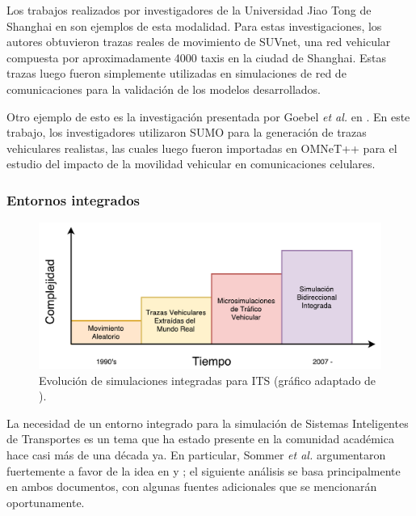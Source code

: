 Los trabajos realizados por investigadores de la Universidad Jiao Tong de Shanghai en \autocite{suvnet1,suvnet2} son ejemplos de esta modalidad. Para estas investigaciones, los autores obtuvieron trazas reales de movimiento de SUVnet, una red vehicular compuesta por aproximadamente 4000 taxis en la ciudad de Shanghai. Estas trazas luego fueron simplemente utilizadas en simulaciones de red de comunicaciones para la validación de los modelos desarrollados.

Otro ejemplo de esto es la investigación presentada por Goebel \emph{et al.} en \autocite{omnetv2xtraces}. En este trabajo, los investigadores utilizaron SUMO para la generación de trazas vehiculares realistas, las cuales luego fueron importadas en OMNeT++ para el estudio del impacto de la movilidad vehicular en comunicaciones celulares. 

\subsubsection{Entornos integrados}\label{sec:integrated_sim}

\begin{figure}
    \centering
    \includegraphics[width=\linewidth]{figuras/sommer_adapted.pdf}
    \caption[Evolución de simulaciones integradas.]{Evolución de simulaciones integradas para ITS (gráfico adaptado de \autocite{sommer_dressler2}).}
    \label{fig:bidir_evol}
\end{figure}

La necesidad de un entorno integrado para la simulación de Sistemas Inteligentes de Transportes es un tema que ha estado presente en la comunidad académica hace casi más de una década ya. En particular, Sommer \emph{et al.} argumentaron fuertemente a favor de la idea en \autocite{sommer2008need} y \autocite{sommer_dressler2}; el siguiente análisis se basa principalmente en ambos documentos, con algunas fuentes adicionales que se mencionarán oportunamente. 


